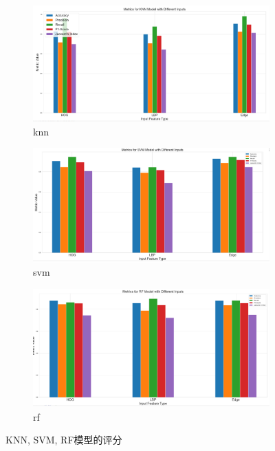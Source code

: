 \documentclass[a4paper, 10pt]{article}
\begin{document}
	\begin{figure}[htbp] 
		\centering 
		
		\begin{subfigure}{0.3\textwidth}
			\includegraphics[width=\linewidth]{picture/KNN}
			\caption{knn}
			\label{fig: knn}	
		\end{subfigure}
		\begin{subfigure}{0.3\textwidth}
			\includegraphics[width=\linewidth]{picture/SVM}
			\caption{svm}
			\label{fig: svm}
		\end{subfigure}	
		\begin{subfigure}{0.3\textwidth}
			\includegraphics[width=\linewidth]{picture/RF}
			\caption{rf}
			\label{fig: rf}
		\end{subfigure}	
		\caption{
			\label{fig: Ensemble Val}
			KNN, SVM, RF模型的评分
		}
	\end{figure}
	
\end{document}
